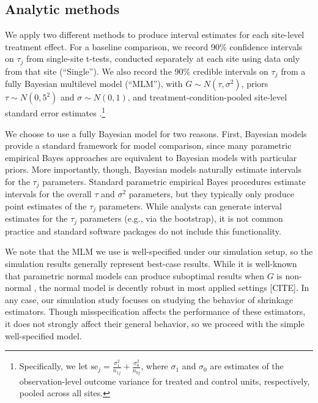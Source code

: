 \documentclass[]{article}
\begin{document}
\subsection{Analytic methods}

We apply two different methods to produce interval estimates for each site-level treatment effect.
For a baseline comparison, we record 90\% confidence intervals on $\tau_j$ from single-site t-tests, conducted separately at each site using data only from that site (``Single'').
We also record the 90\% credible intervals on $\tau_j$ from a fully Bayesian multilevel model (``MLM''), with $G \sim N(\tau, \sigma^2)$, priors $\tau \sim N(0,5^2)$ and $\sigma \sim N(0,1)$, and treatment-condition-pooled site-level standard error estimates \citep{bloom2017using}.\footnote{Specifically, we let $\text{se}_j = \frac{\sigma_1^2}{n_{1j}} + \frac{\sigma_0^2}{n_{0j}}$, where $\sigma_{1}$ and $\sigma_{0}$ are estimates of the observation-level outcome variance for treated and control units, respectively, pooled across all sites.}

We choose to use a fully Bayesian model for two reasons.
First, Bayesian models provide a standard framework for model comparison, since many parametric empirical Bayes approaches are equivalent to Bayesian models with particular priors.
More importantly, though, Bayesian models naturally estimate intervals for the $\tau_j$ parameters.
Standard parametric empirical Bayes procedures estimate intervals for the overall $\tau$ and $\sigma^2$ parameters, but they typically only produce point estimates of the $\tau_j$ parameters.
While analysts can generate interval estimates for the $\tau_j$ parameters (e.g., via the bootstrap), it is not common practice and standard software packages do not include this functionality.

We note that the MLM we use is well-specified under our simulation setup, so the simulation results generally represent best-case results.
While it is well-known that parametric normal models can produce suboptimal results when $G$ is non-normal \citep{armstrong2020robust}, the normal model is decently robust in most applied settings [CITE].
In any case, our simulation study focuses on studying the behavior of shrinkage estimators.
Though misspecification affects the performance of these estimators, it does not strongly affect their general behavior, so we proceed with the simple well-specified model.

\end{document}
